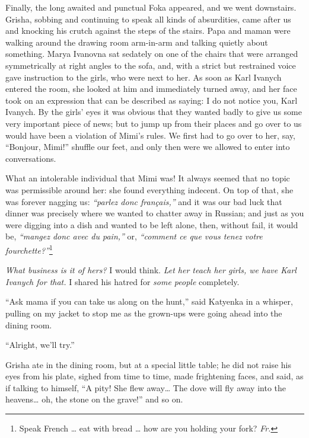 Finally, the long awaited and punctual Foka appeared, and we went downstairs. Grisha, sobbing and continuing to speak all kinds of absurdities, came after us and knocking his crutch against the steps of the stairs. Papa and maman were walking around the drawing room arm-in-arm and talking quietly about something. Marya Ivanovna sat sedately on one of the chairs that were arranged symmetrically at right angles to the sofa, and, with a strict but restrained voice gave instruction to the girls, who were next to her.  As soon as Karl Ivanych entered the room, she looked at him and immediately turned away, and her face took on an expression that can be described as saying: I do not notice you, Karl Ivanych. By the girls' eyes it was obvious that they wanted badly to give us some very important piece of news; but to jump up from their places and go over to us would have been a violation of Mimi's rules. We first had to go over to her, say, ``Bonjour, Mimi!''  shuffle our feet, and only then were we allowed to enter into conversations.

What an intolerable individual that Mimi was! It always seemed that no topic was permissible around her: she found everything indecent. On top of that, she was forever nagging us: \textit{``parlez donc fran\c cais,''} and it was our bad luck that dinner was precisely where we wanted to chatter away in Russian; and just as you were digging into a dish and wanted to be left alone, then, without fail, it would be, \textit{``mangez donc avec du pain,''} or, \textit{``comment ce que vous tenez votre fourchette?''}\footnote{Speak French \ldots{} eat with bread \ldots{} how are you holding your fork? \textit{Fr.}}  %

\textit{What business is it of hers?} I would think. \textit{Let her teach her girls, we have Karl Ivanych for that.} I shared his hatred for \emph{some people} completely. 

``Ask mama if you can take us along on the hunt,'' said Katyenka in a whisper, pulling on my jacket to stop me as the grown-ups were going ahead into the dining room. %

``Alright, we'll try.'' %

Grisha ate in the dining room, but at a special little table; he did not raise his eyes from his plate, sighed from time to time, made frightening faces, and said, as if talking to himself, ``A pity! She flew away\ldots{} The dove will fly away into the heavens\ldots{} oh, the stone on the grave!'' and so on. %

